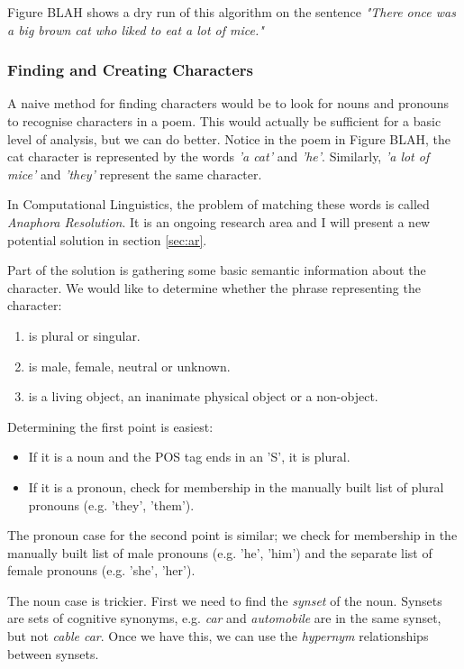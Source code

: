 Figure BLAH shows a dry run of this algorithm on the sentence \textit{"There once was a big brown cat who liked to eat a lot of mice."}

\subsubsection{Finding and Creating Characters}
\label{sec:characters} 

A naive method for finding characters would be to look for nouns and pronouns to recognise characters in a poem. This would actually be sufficient for a basic level of analysis, but we can do better. Notice in the poem in Figure BLAH, the cat character is represented by the words \textit{'a cat'} and \textit{'he'}. Similarly, \textit{'a lot of mice'} and \textit{'they'} represent the same character.

In Computational Linguistics, the problem of matching these words is called \textit{Anaphora Resolution}. It is an ongoing research area and I will present a new potential solution in section \ref{sec:ar}.

Part of the solution is gathering some basic semantic information about the character. We would like to determine whether the phrase representing the character:

\begin{enumerate}
\item{is plural or singular.}
\item{is male, female, neutral or unknown.}
\item{is a living object, an inanimate physical object or a non-object.}
\end{enumerate}

Determining the first point is easiest:
\begin{itemize}
\item{If it is a noun and the POS tag ends in an 'S', it is plural.}
\item{If it is a pronoun, check for membership in the manually built list of plural pronouns (e.g. 'they', 'them').}
\end{itemize}

The pronoun case for the second point is similar; we check for membership in the manually built list of male pronouns (e.g. 'he', 'him') and the separate list of female pronouns (e.g. 'she', 'her'). 

The noun case is trickier. First we need to find the \textit{synset} of the noun. Synsets are sets of cognitive synonyms, e.g. \textit{car} and \textit{automobile} are in the same synset, but not \textit{cable car}. Once we have this, we can use the \textit{hypernym} relationships between synsets.

